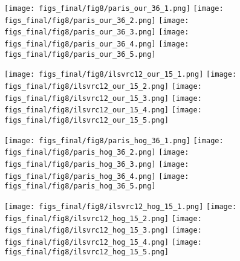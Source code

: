 \documentclass[10pt,twocolumn,letterpaper]{article}
\begin{document}
\begin{figure*}[t]
\vspace{-0.5em}
\begin{subfigure}[b]{0.5\linewidth}
\centering
{}\;
\texttt{[image: figs\_final/fig8/paris\_our\_36\_1.png]}
\texttt{[image: figs\_final/fig8/paris\_our\_36\_2.png]}
\texttt{[image: figs\_final/fig8/paris\_our\_36\_3.png]}
\texttt{[image: figs\_final/fig8/paris\_our\_36\_4.png]}
\texttt{[image: figs\_final/fig8/paris\_our\_36\_5.png]}
\end{subfigure}
\begin{subfigure}[b]{0.5\linewidth}
\centering
{}\;
\texttt{[image: figs\_final/fig8/ilsvrc12\_our\_15\_1.png]}
\texttt{[image: figs\_final/fig8/ilsvrc12\_our\_15\_2.png]}
\texttt{[image: figs\_final/fig8/ilsvrc12\_our\_15\_3.png]}
\texttt{[image: figs\_final/fig8/ilsvrc12\_our\_15\_4.png]}
\texttt{[image: figs\_final/fig8/ilsvrc12\_our\_15\_5.png]}
\end{subfigure}
\begin{subfigure}[b]{0.5\linewidth}
\centering
{}\;
\texttt{[image: figs\_final/fig8/paris\_hog\_36\_1.png]}
\texttt{[image: figs\_final/fig8/paris\_hog\_36\_2.png]}
\texttt{[image: figs\_final/fig8/paris\_hog\_36\_3.png]}
\texttt{[image: figs\_final/fig8/paris\_hog\_36\_4.png]}
\texttt{[image: figs\_final/fig8/paris\_hog\_36\_5.png]}
\end{subfigure}
\begin{subfigure}[b]{0.5\linewidth}
\centering
{}\;
\texttt{[image: figs\_final/fig8/ilsvrc12\_hog\_15\_1.png]}
\texttt{[image: figs\_final/fig8/ilsvrc12\_hog\_15\_2.png]}
\texttt{[image: figs\_final/fig8/ilsvrc12\_hog\_15\_3.png]}
\texttt{[image: figs\_final/fig8/ilsvrc12\_hog\_15\_4.png]}
\texttt{[image: figs\_final/fig8/ilsvrc12\_hog\_15\_5.png]}

\end{subfigure}
\end{figure*}
\end{document}
